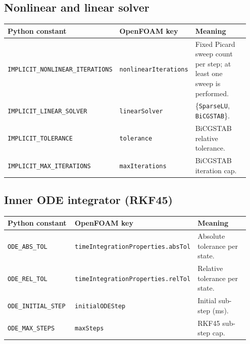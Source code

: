 \documentclass[11pt,a4paper]{article}
\newcommand{\code}[1]{\texttt{\small #1}}
\begin{document}
\subsection{Nonlinear and linear solver}
\begin{longtable}{@{}p{0.35\linewidth}p{0.30\linewidth}p{0.30\linewidth}@{}}
\toprule
Python constant & OpenFOAM key & Meaning \\
\midrule \endhead
\code{IMPLICIT\_NONLINEAR\_ITERATIONS} & \code{nonlinearIterations} &
   Fixed Picard sweep count per step; at least one sweep is performed. \\
\code{IMPLICIT\_LINEAR\_SOLVER} & \code{linearSolver} &
   \{\code{SparseLU}, \code{BiCGSTAB}\}. \\
\code{IMPLICIT\_TOLERANCE} & \code{tolerance} &
   BiCGSTAB relative tolerance. \\
\code{IMPLICIT\_MAX\_ITERATIONS} & \code{maxIterations} &
   BiCGSTAB iteration cap. \\
\bottomrule
\end{longtable}

\subsection{Inner ODE integrator (RKF45)}
\begin{longtable}{@{}p{0.30\linewidth}p{0.30\linewidth}p{0.35\linewidth}@{}}
\toprule
Python constant & OpenFOAM key & Meaning \\
\midrule \endhead
\code{ODE\_ABS\_TOL} & \code{timeIntegrationProperties.absTol} &
   Absolute tolerance per state. \\
\code{ODE\_REL\_TOL} & \code{timeIntegrationProperties.relTol} &
   Relative tolerance per state. \\
\code{ODE\_INITIAL\_STEP} & \code{initialODEStep} &
   Initial sub-step (ms). \\
\code{ODE\_MAX\_STEPS} & \code{maxSteps} & RKF45 sub-step cap. \\
\bottomrule
\end{longtable}
\end{document}
